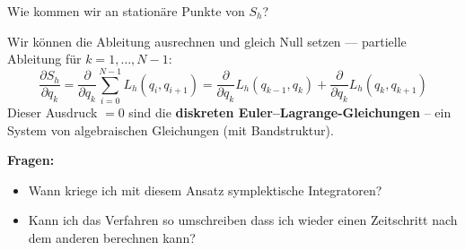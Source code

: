 \documentclass[german]{scrreprt}
\let\emph\textbf
\theoremstyle{plain}
\theoremstyle{nonumberplain}
\theoremstyle{nonumberplain}
\theoremstyle{nonumberplain}
\begin{document}
Wie kommen wir an stationäre Punkte von $S_h$?

Wir können die Ableitung ausrechnen und gleich Null setzen --- partielle Ableitung für $k=1, \dots, N-1$:
\begin{equation*}
\frac{\partial S_h}{\partial q_k}
=
\frac{\partial}{\partial q_k} \sum_{i=0}^{N-1} L_h (q_i, q_{i+1})
=
\frac{\partial}{\partial q_k} L_h(q_{k-1}, q_k) +  \frac{\partial}{\partial q_k} L_h(q_k, q_{k+1})
\end{equation*}
Dieser Ausdruck $=0$ sind die \emph{diskreten Euler--Lagrange-Gleichungen} -- ein System von algebraischen Gleichungen (mit Bandstruktur).

\textbf{Fragen:}
\begin{itemize}
	\item Wann kriege ich mit diesem Ansatz symplektische Integratoren?
	\item Kann ich das Verfahren so umschreiben dass ich wieder einen Zeitschritt nach dem anderen berechnen kann?
\end{itemize}



\end{document}
